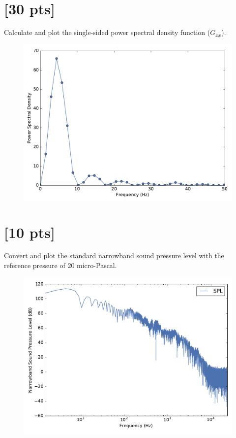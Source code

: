 \documentclass[onecolumn,10pt]{jhwhw}
\begin{document}
\part{[30 pts]} Calculate and plot the single-sided power spectral density function ($G_{xx}$).
\solution

\begin{figure}[h]
  \centering
  \includegraphics[height=0.3\textheight]{figs/G_xx.pdf}%
\end{figure}

\part{[10 pts]} Convert and plot the standard narrowband sound pressure level with the reference pressure of 20 micro-Pascal.
\solution

\begin{figure}[h]
  \centering
  \includegraphics[height=0.3\textheight]{figs/narrowband.pdf}%
\end{figure}
\end{document}
